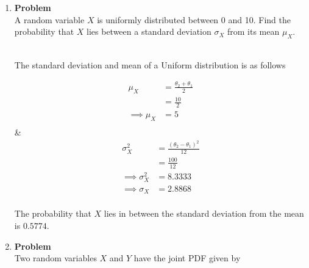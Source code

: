\documentclass[12pt]{article}
\newenvironment{Ex}{\textbf{Problem}\vspace{.75em}\\}{}
\begin{document}
\begin{enumerate}
\begin{Ex}
\begin{solution}
\begin{enumerate}
\begin{equation}
\begin{aligned}
            &= 0.6826^{10} \\
            \implies P(\text{none defective}) &= 0.02196 \\
          \end{aligned}
        \end{equation}
      \end{enumerate}
    \end{solution}
  \end{Ex}
\item
  \begin{Ex}
    A random variable $X$ is uniformly distributed between 0 and
    10. Find the probability that $X$ lies between a standard deviation
    $\sigma_X$ from its mean $\mu_X$.
    \begin{solution} \hfill \vspace{.75em}\\
      The standard deviation and mean of a Uniform distribution is as
      follows
      \begin{multicols}{2}
        \begin{equation}
          \label{eq:5-dev}
          \begin{aligned}
            \mu_X &= \frac{\theta_2 + \theta_1}{2} \\
            &= \frac{10}{2} \\
            \implies \mu_X &= 5 \\
          \end{aligned}
        \end{equation} &
        \begin{equation}
          \label{eq:5-mean}
          \begin{aligned}
            \sigma_X^2 &= \frac{(\theta_2 - \theta_1)^2}{12} \\
            &= \frac{100}{12} \\
            \implies \sigma_X^2 &= 8.3333 \\
            \implies \sigma_X &= 2.8868 \\
          \end{aligned}
        \end{equation}
      \end{multicols}
      The probability that $X$ lies in between the standard deviation
      from the mean is $0.5774$.
    \end{solution}
  \end{Ex}
\item
  \begin{Ex}
    Two random variables $X$ and $Y$ have the joint PDF given by

\end{Ex}
\end{enumerate}
\end{document}
